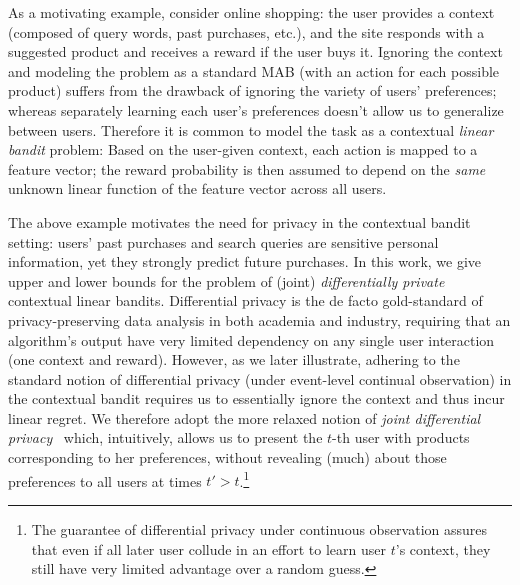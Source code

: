\documentclass{article}
\begin{document}

As a motivating example, consider online shopping: the user provides a
context (composed of query words, past purchases, etc.), and the site
responds with a suggested product and receives a reward if the user
buys it.  Ignoring the context and modeling the problem as a standard
MAB (with an action for each possible product) suffers from the
drawback of ignoring the variety of users' preferences; whereas separately
learning each user's preferences doesn't allow us to generalize
between users.  Therefore it is common to model the task as a
contextual \emph{linear bandit} problem: Based on the user-given
context, each action is mapped to a feature vector; the
reward probability is then assumed to depend on the \emph{same} unknown linear
function of the feature vector across all users.

The above example motivates the need for privacy in the contextual
bandit setting: users' past purchases and search queries are sensitive personal
information, yet they strongly predict future purchases.
In this work, we give upper and lower bounds for the
problem of (joint) \emph{differentially private} contextual linear
bandits. Differential privacy is the de facto gold-standard of
privacy-preserving data analysis in both academia and industry,
requiring that an algorithm's output have very limited dependency on
any single user interaction (one context and reward).  However, as we
later illustrate, adhering to the standard notion of differential
privacy (under event-level continual observation) in the contextual bandit
requires us to essentially ignore the context and thus incur linear
regret.  We therefore adopt the more relaxed notion of \emph{joint
  differential privacy}~\citep{KearnsMechanismDesign2014} which,
intuitively, allows us to present the $t$-th user with products
corresponding to her preferences, without revealing (much) about those
preferences to all users at times $t'>t$.\footnote{The guarantee of
  differential privacy under continuous observation assures that
  even if all later user collude in an effort to learn user $t$'s
  context, they still have very limited advantage over a random
  guess.}
\end{document}

